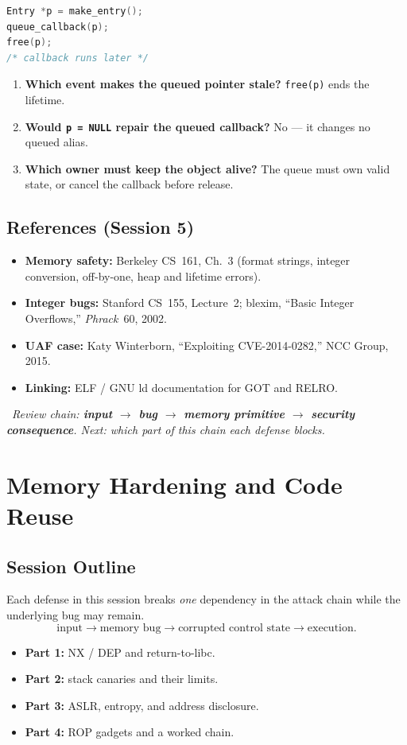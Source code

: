 \documentclass[hidelinks]{article}
\newcommand{\callout}[1]{\par\smallskip\noindent{\color{capri}$\blacktriangleright$}\ \textit{#1}\par\smallskip}
\begin{document}
\begin{lstlisting}[language=C]
Entry *p = make_entry();
queue_callback(p);
free(p);
/* callback runs later */
\end{lstlisting}
\begin{enumerate}
    \item \textbf{Which event makes the queued pointer stale?} \texttt{free(p)} ends the lifetime.
    \item \textbf{Would \texttt{p = NULL} repair the queued callback?} No --- it changes no queued alias.
    \item \textbf{Which owner must keep the object alive?} The queue must own valid state, or cancel the callback before release.
\end{enumerate}

\subsection{References (Session 5)}

\begin{itemize}
    \item \textbf{Memory safety:} Berkeley CS~161, Ch.~3 (format strings, integer conversion, off-by-one, heap and lifetime errors).
    \item \textbf{Integer bugs:} Stanford CS~155, Lecture~2; blexim, ``Basic Integer Overflows,'' \textit{Phrack}~60, 2002.
    \item \textbf{UAF case:} Katy Winterborn, ``Exploiting CVE-2014-0282,'' NCC Group, 2015.
    \item \textbf{Linking:} ELF / GNU ld documentation for GOT and RELRO.
\end{itemize}

\callout{Review chain: \textbf{input $\to$ bug $\to$ memory primitive $\to$ security consequence}. Next: which part of this chain each defense blocks.}

\newpage
\section{Memory Hardening and Code Reuse}

\subsection{Session Outline}

Each defense in this session breaks \emph{one} dependency in the attack chain while the underlying bug may remain.
\[
\text{input} \to \text{memory bug} \to \text{corrupted control state} \to \text{execution}.
\]
\begin{itemize}
    \item \textbf{Part 1:} NX / DEP and return-to-libc.
    \item \textbf{Part 2:} stack canaries and their limits.
    \item \textbf{Part 3:} ASLR, entropy, and address disclosure.
    \item \textbf{Part 4:} ROP gadgets and a worked chain.
\end{itemize}
\end{document}
